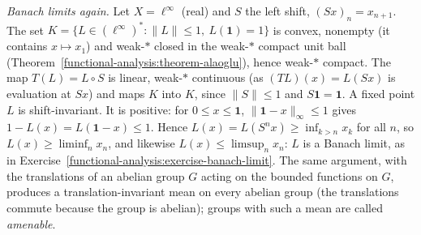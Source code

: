 \begin{example}\label{functional-analysis:example-banach-limit-fixed-point}
\emph{Banach limits again.} Let $X = \ell^\infty$ (real) and $S$ the left shift, $(Sx)_n = x_{n+1}$. The set $K = \{L \in (\ell^\infty)^* : \|L\| \leq 1, \ L(\mathbf{1}) = 1\}$ is convex, nonempty (it contains
$x \mapsto x_1$) and weak-$*$ closed in the weak-$*$ compact unit ball (Theorem~\ref{functional-analysis:theorem-alaoglu}), hence weak-$*$ compact. The map $T(L) = L \circ S$ is linear, weak-$*$ continuous (as
$(TL)(x) = L(Sx)$ is evaluation at $Sx$) and maps $K$ into $K$, since $\|S\| \leq 1$ and $S\mathbf{1} = \mathbf{1}$. A fixed point $L$ is shift-invariant. It is positive: for $0 \leq x \leq \mathbf{1}$,
$\|\mathbf{1} - x\|_\infty \leq 1$ gives $1 - L(x) = L(\mathbf{1} - x) \leq 1$. Hence $L(x) = L(S^nx) \geq \inf_{k > n}x_k$ for all $n$, so $L(x) \geq \liminf_nx_n$, and likewise $L(x) \leq \limsup_nx_n$: $L$ is a
Banach limit, as in Exercise~\ref{functional-analysis:exercise-banach-limit}. The same argument, with the translations of an abelian group $G$ acting on the bounded functions on $G$, produces a
translation-invariant mean on every abelian group (the translations commute because the group is abelian); groups with such a mean are called \emph{amenable}.
\end{example}

